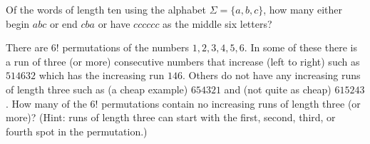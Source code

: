 \begin{prob} 
Of the words of length ten using the alphabet $\Sigma =\{a,b,c\}$, how many either begin $abc$ or end $cba$ or have  $cccccc$ as the middle six letters? 
\end{prob}

\begin{prob}
There are $6!$ permutations of the numbers $1,2,3,4,5,6$.  In some of these there is a run of three (or more) consecutive numbers that increase (left to right)
such as $ 5 1 4 6 3 2$ which has the increasing run $1 4 6$. Others do not have any increasing runs of length three such as (a cheap example)
$6 5 4 3 2 1$ and (not quite as cheap) $6 1 5 2 4 3$. How many of the $6!$ permutations contain no increasing runs of length three (or more)?
(Hint: runs of length three can start with the first, second, third, or fourth spot in the permutation.)
\end{prob}


